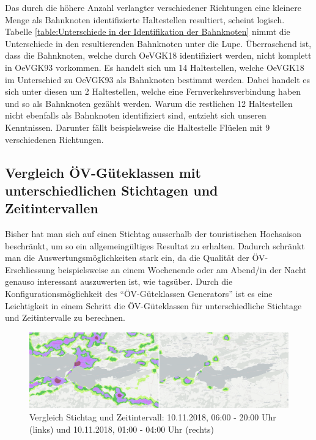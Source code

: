Das durch die höhere Anzahl verlangter verschiedener Richtungen eine kleinere Menge als Bahnknoten identifizierte Haltestellen resultiert, scheint logisch.
Tabelle \ref{table:Unterschiede in der Identifikation der Bahnknoten} nimmt die Unterschiede in den resultierenden Bahnknoten unter die Lupe.
Überraschend ist, dass die Bahnknoten, welche durch OeVGK18 identifiziert werden, nicht komplett in OeVGK93 vorkommen.
Es handelt sich um 14 Haltestellen, welche OeVGK18 im Unterschied zu OeVGK93 als Bahnknoten bestimmt werden.
Dabei handelt es sich unter diesen um 2 Haltestellen, welche eine Fernverkehrsverbindung haben und so als Bahnknoten gezählt werden.
Warum die restlichen 12 Haltestellen nicht ebenfalls als Bahnknoten identifiziert sind, entzieht sich unseren Kenntnissen.
Darunter fällt beispielsweise die Haltestelle Flüelen mit 9 verschiedenen Richtungen.

\subsection{Vergleich ÖV-Güteklassen mit unterschiedlichen Stichtagen und Zeitintervallen}
\label{Resultate:Vergleich ÖV-Güteklassen mit unterschiedlichen Stichtagen und Zeitintervallen}

Bisher hat man sich auf einen Stichtag ausserhalb der touristischen Hochsaison beschränkt, um so ein allgemeingültiges Resultat zu erhalten.
Dadurch schränkt man die Auswertungsmöglichkeiten stark ein, da die Qualität der \acs{ÖV}-Erschliessung beispielsweise an einem Wochenende oder am Abend/in der Nacht genauso interessant auszuwerten ist, wie tagsüber.
Durch die Konfigurationsmöglichkeit des "`\acs{ÖV}-Güteklassen Generators"' ist es eine Leichtigkeit in einem Schritt die \acs{ÖV}-Güteklassen für unterschiedliche Stichtage und Zeitintervalle zu berechnen.

\begin{figure}[ht]
    \centering
    \includegraphics[width=1.0\linewidth]{technicalreport/img/due_date_comparison.png}
    \caption[Vergleich Stichtag und Zeitintervall]{Vergleich Stichtag und Zeitintervall: 10.11.2018, 06:00 - 20:00 Uhr (links) und 10.11.2018, 01:00 - 04:00 Uhr (rechts)}
    \label{fig:due_date_comparison}
\end{figure}


